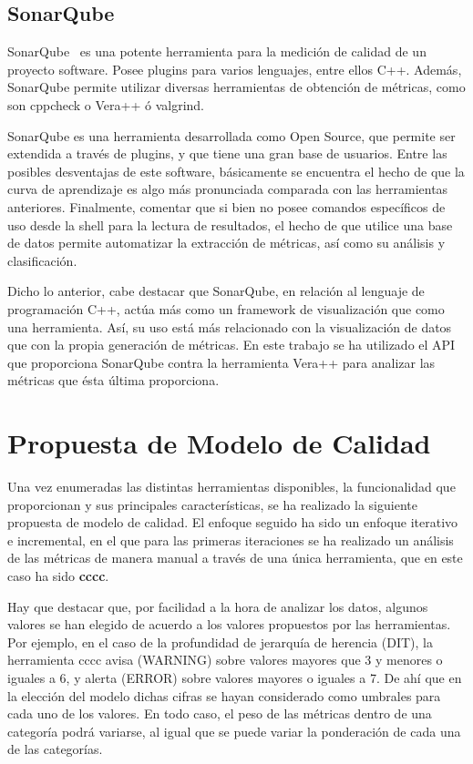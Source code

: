 \documentclass[11pt]{article}
\begin{document}
\subsection{SonarQube}

SonarQube~\cite{metrictools:sonarqube} es una potente herramienta para la medición de calidad de un proyecto software. Posee plugins para varios lenguajes, entre ellos C++. Además, SonarQube permite utilizar diversas herramientas de obtención de métricas, como son cppcheck o Vera++ ó valgrind.

SonarQube es una herramienta desarrollada como Open Source, que permite ser extendida a través de plugins, y que tiene una gran base de usuarios. Entre las posibles desventajas de este software, básicamente se encuentra el hecho de que la curva de aprendizaje es algo más pronunciada comparada con las herramientas anteriores. Finalmente, comentar que si bien no posee comandos específicos de uso desde la shell para la lectura de resultados, el hecho de que utilice una base de datos permite automatizar la extracción de métricas, así como su análisis y clasificación.

Dicho lo anterior, cabe destacar que SonarQube, en relación al lenguaje de programación C++, actúa más como un framework de visualización que como una herramienta. Así, su uso está más relacionado con la visualización de datos que con la propia generación de métricas. En este trabajo se ha utilizado el API que proporciona SonarQube contra la herramienta Vera++ para analizar las métricas que ésta última proporciona.

\section{Propuesta de Modelo de Calidad}
\label{sec:quality_model}

Una vez enumeradas las distintas herramientas disponibles, la funcionalidad que proporcionan y sus principales características, se ha realizado la siguiente propuesta de modelo de calidad. El enfoque seguido ha sido un enfoque iterativo e incremental, en el que para las primeras iteraciones se ha realizado un análisis de las métricas de manera manual a través de una única herramienta, que en este caso ha sido \textbf{cccc}.

Hay que destacar que, por facilidad a la hora de analizar los datos, algunos valores se han elegido de acuerdo a los valores propuestos por las herramientas. Por ejemplo, en el caso de la profundidad de jerarquía de herencia (DIT), la herramienta cccc avisa (WARNING) sobre valores mayores que 3 y menores o iguales a 6, y alerta (ERROR) sobre valores mayores o iguales a 7. De ahí que en la elección del modelo dichas cifras se hayan considerado como umbrales para cada uno de los valores. En todo caso, el peso de las métricas dentro de una categoría podrá variarse, al igual que se puede variar la ponderación de cada una de las categorías.
\end{document}

